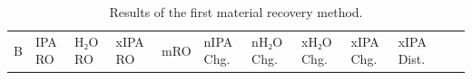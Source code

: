 \begin{longtable}[]{@{}
  >{\raggedleft\arraybackslash}p{}
  >{\raggedleft\arraybackslash}p{}
  >{\raggedleft\arraybackslash}p{}
  >{\raggedleft\arraybackslash}p{}
  >{\raggedleft\arraybackslash}p{}
  >{\raggedleft\arraybackslash}p{}
  >{\raggedleft\arraybackslash}p{}
  >{\raggedleft\arraybackslash}p{}
  >{\raggedleft\arraybackslash}p{}
  >{\raggedleft\arraybackslash}p{}
  >{\raggedleft\arraybackslash}p{}
  >{\raggedleft\arraybackslash}p{}@{}}
\caption{Results of the first material recovery method.
\label{tab: Results of the first material recovery method}}\tabularnewline
\toprule\noalign{}
\begin{minipage}[b]{\linewidth}\raggedleft
B
\end{minipage} & \begin{minipage}[b]{\linewidth}\raggedleft
IPA RO
\end{minipage} & \begin{minipage}[b]{\linewidth}\raggedleft
H₂O RO
\end{minipage} & \begin{minipage}[b]{\linewidth}\raggedleft
xIPA RO
\end{minipage} & \begin{minipage}[b]{\linewidth}\raggedleft
mRO
\end{minipage} & \begin{minipage}[b]{\linewidth}\raggedleft
nIPA Chg.
\end{minipage} & \begin{minipage}[b]{\linewidth}\raggedleft
nH₂O Chg.
\end{minipage} & \begin{minipage}[b]{\linewidth}\raggedleft
xH₂O Chg.
\end{minipage} & \begin{minipage}[b]{\linewidth}\raggedleft
xIPA Chg.
\end{minipage} & \begin{minipage}[b]{\linewidth}\raggedleft
xIPA Dist.
\end{minipage} & \begin{minipage}[b]{\linewidth}\raggedleft

\end{minipage}
\end{longtable}

